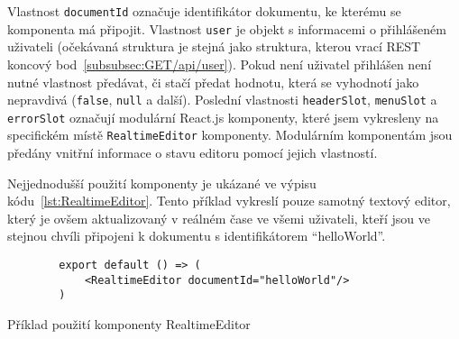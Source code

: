 Vlastnost \texttt{documentId} označuje identifikátor dokumentu, ke kterému se komponenta má připojit.
Vlastnost \texttt{user} je objekt s informacemi o přihlášeném uživateli (očekávaná struktura je stejná jako struktura, kterou vrací \gls{REST} koncový bod~\ref{subsubsec:GET/api/user}).
Pokud není uživatel přihlášen není nutné vlastnost předávat, či stačí předat hodnotu, která se vyhodnotí jako nepravdivá (\texttt{false}, \texttt{null} a další).
Poslední vlastnosti \texttt{headerSlot}, \texttt{menuSlot} a \texttt{errorSlot} označují modulární React.js komponenty, které jsem vykresleny na specifickém místě \texttt{RealtimeEditor} komponenty.
Modulárním komponentám jsou předány vnitřní informace o stavu editoru pomocí jejich vlastností.

Nejjednodušší použití komponenty je ukázané ve výpisu kódu~\ref{lst:RealtimeEditor}.
Tento příklad vykreslí pouze samotný textový editor, který je ovšem aktualizovaný v reálném čase ve všemi uživateli, kteří jsou ve stejnou chvíli připojeni k dokumentu s identifikátorem \enquote{helloWorld}.

\begin{listing}[ht]
    \begin{verbatim}
        export default () => (
            <RealtimeEditor documentId="helloWorld"/>
        )
    \end{verbatim}

    \caption{Příklad použití komponenty RealtimeEditor}\label{lst:RealtimeEditor}
\end{listing}


